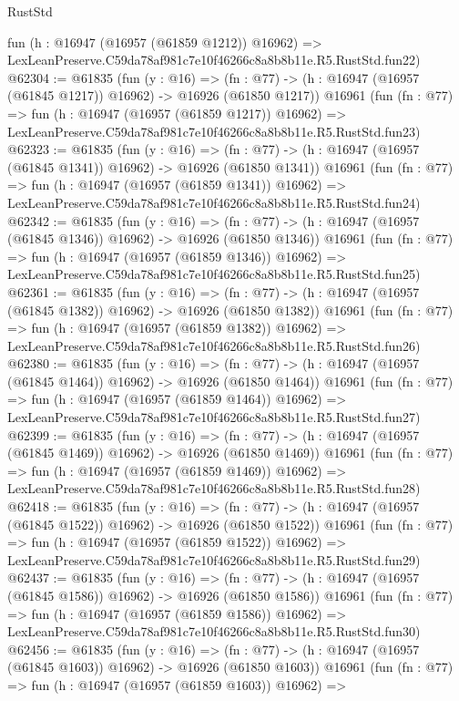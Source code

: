 \begin{lexlean}{RustStd}
\begin{coremodule}
    fun (h : @16947 (@16957 (@61859 @1212)) @16962) =>
    LexLeanPreserve.C59da78af981c7e10f46266c8a8b8b11e.R5.RustStd.fun22)
@62304 := @61835
    (fun (y : @16) =>
    (fn : @77) -> (h : @16947 (@16957 (@61845 @1217)) @16962) -> @16926 (@61850 @1217))
    @16961
    (fun (fn : @77) =>
    fun (h : @16947 (@16957 (@61859 @1217)) @16962) =>
    LexLeanPreserve.C59da78af981c7e10f46266c8a8b8b11e.R5.RustStd.fun23)
@62323 := @61835
    (fun (y : @16) =>
    (fn : @77) -> (h : @16947 (@16957 (@61845 @1341)) @16962) -> @16926 (@61850 @1341))
    @16961
    (fun (fn : @77) =>
    fun (h : @16947 (@16957 (@61859 @1341)) @16962) =>
    LexLeanPreserve.C59da78af981c7e10f46266c8a8b8b11e.R5.RustStd.fun24)
@62342 := @61835
    (fun (y : @16) =>
    (fn : @77) -> (h : @16947 (@16957 (@61845 @1346)) @16962) -> @16926 (@61850 @1346))
    @16961
    (fun (fn : @77) =>
    fun (h : @16947 (@16957 (@61859 @1346)) @16962) =>
    LexLeanPreserve.C59da78af981c7e10f46266c8a8b8b11e.R5.RustStd.fun25)
@62361 := @61835
    (fun (y : @16) =>
    (fn : @77) -> (h : @16947 (@16957 (@61845 @1382)) @16962) -> @16926 (@61850 @1382))
    @16961
    (fun (fn : @77) =>
    fun (h : @16947 (@16957 (@61859 @1382)) @16962) =>
    LexLeanPreserve.C59da78af981c7e10f46266c8a8b8b11e.R5.RustStd.fun26)
@62380 := @61835
    (fun (y : @16) =>
    (fn : @77) -> (h : @16947 (@16957 (@61845 @1464)) @16962) -> @16926 (@61850 @1464))
    @16961
    (fun (fn : @77) =>
    fun (h : @16947 (@16957 (@61859 @1464)) @16962) =>
    LexLeanPreserve.C59da78af981c7e10f46266c8a8b8b11e.R5.RustStd.fun27)
@62399 := @61835
    (fun (y : @16) =>
    (fn : @77) -> (h : @16947 (@16957 (@61845 @1469)) @16962) -> @16926 (@61850 @1469))
    @16961
    (fun (fn : @77) =>
    fun (h : @16947 (@16957 (@61859 @1469)) @16962) =>
    LexLeanPreserve.C59da78af981c7e10f46266c8a8b8b11e.R5.RustStd.fun28)
@62418 := @61835
    (fun (y : @16) =>
    (fn : @77) -> (h : @16947 (@16957 (@61845 @1522)) @16962) -> @16926 (@61850 @1522))
    @16961
    (fun (fn : @77) =>
    fun (h : @16947 (@16957 (@61859 @1522)) @16962) =>
    LexLeanPreserve.C59da78af981c7e10f46266c8a8b8b11e.R5.RustStd.fun29)
@62437 := @61835
    (fun (y : @16) =>
    (fn : @77) -> (h : @16947 (@16957 (@61845 @1586)) @16962) -> @16926 (@61850 @1586))
    @16961
    (fun (fn : @77) =>
    fun (h : @16947 (@16957 (@61859 @1586)) @16962) =>
    LexLeanPreserve.C59da78af981c7e10f46266c8a8b8b11e.R5.RustStd.fun30)
@62456 := @61835
    (fun (y : @16) =>
    (fn : @77) -> (h : @16947 (@16957 (@61845 @1603)) @16962) -> @16926 (@61850 @1603))
    @16961
    (fun (fn : @77) =>
    fun (h : @16947 (@16957 (@61859 @1603)) @16962) =>

\end{coremodule}
\end{lexlean}
